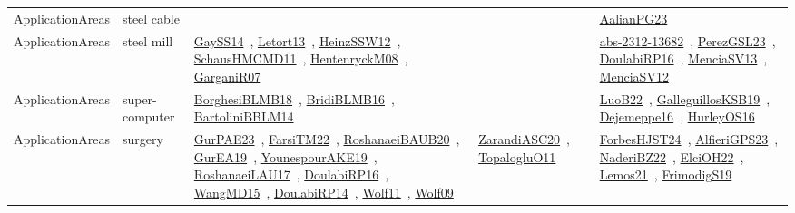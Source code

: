 {\begin{longtable}{lp{3cm}>{\raggedright\arraybackslash}p{6cm}>{\raggedright\arraybackslash}p{6cm}>{\raggedright\arraybackslash}p{8cm}}
ApplicationAreas & steel cable &  &  & \href{../works/AalianPG23.pdf}{AalianPG23}~\cite{AalianPG23}\\
ApplicationAreas & steel mill & \href{../works/GaySS14.pdf}{GaySS14}~\cite{GaySS14}, \href{../works/Letort13.pdf}{Letort13}~\cite{Letort13}, \href{../works/HeinzSSW12.pdf}{HeinzSSW12}~\cite{HeinzSSW12}, \href{../works/SchausHMCMD11.pdf}{SchausHMCMD11}~\cite{SchausHMCMD11}, \href{../works/HentenryckM08.pdf}{HentenryckM08}~\cite{HentenryckM08}, \href{../works/GarganiR07.pdf}{GarganiR07}~\cite{GarganiR07} &  & \href{../works/abs-2312-13682.pdf}{abs-2312-13682}~\cite{abs-2312-13682}, \href{../works/PerezGSL23.pdf}{PerezGSL23}~\cite{PerezGSL23}, \href{../works/DoulabiRP16.pdf}{DoulabiRP16}~\cite{DoulabiRP16}, \href{../works/MenciaSV13.pdf}{MenciaSV13}~\cite{MenciaSV13}, \href{../works/MenciaSV12.pdf}{MenciaSV12}~\cite{MenciaSV12}\\
ApplicationAreas & super-computer & \href{../works/BorghesiBLMB18.pdf}{BorghesiBLMB18}~\cite{BorghesiBLMB18}, \href{../works/BridiBLMB16.pdf}{BridiBLMB16}~\cite{BridiBLMB16}, \href{../works/BartoliniBBLM14.pdf}{BartoliniBBLM14}~\cite{BartoliniBBLM14} &  & \href{../works/LuoB22.pdf}{LuoB22}~\cite{LuoB22}, \href{../works/GalleguillosKSB19.pdf}{GalleguillosKSB19}~\cite{GalleguillosKSB19}, \href{../works/Dejemeppe16.pdf}{Dejemeppe16}~\cite{Dejemeppe16}, \href{../works/HurleyOS16.pdf}{HurleyOS16}~\cite{HurleyOS16}\\
ApplicationAreas & surgery & \href{../works/GurPAE23.pdf}{GurPAE23}~\cite{GurPAE23}, \href{../works/FarsiTM22.pdf}{FarsiTM22}~\cite{FarsiTM22}, \href{../works/RoshanaeiBAUB20.pdf}{RoshanaeiBAUB20}~\cite{RoshanaeiBAUB20}, \href{../works/GurEA19.pdf}{GurEA19}~\cite{GurEA19}, \href{../works/YounespourAKE19.pdf}{YounespourAKE19}~\cite{YounespourAKE19}, \href{../works/RoshanaeiLAU17.pdf}{RoshanaeiLAU17}~\cite{RoshanaeiLAU17}, \href{../works/DoulabiRP16.pdf}{DoulabiRP16}~\cite{DoulabiRP16}, \href{../works/WangMD15.pdf}{WangMD15}~\cite{WangMD15}, \href{../works/DoulabiRP14.pdf}{DoulabiRP14}~\cite{DoulabiRP14}, \href{../works/Wolf11.pdf}{Wolf11}~\cite{Wolf11}, \href{../works/Wolf09.pdf}{Wolf09}~\cite{Wolf09} & \href{../works/ZarandiASC20.pdf}{ZarandiASC20}~\cite{ZarandiASC20}, \href{../works/TopalogluO11.pdf}{TopalogluO11}~\cite{TopalogluO11} & \href{../works/ForbesHJST24.pdf}{ForbesHJST24}~\cite{ForbesHJST24}, \href{../works/AlfieriGPS23.pdf}{AlfieriGPS23}~\cite{AlfieriGPS23}, \href{../works/NaderiBZ22.pdf}{NaderiBZ22}~\cite{NaderiBZ22}, \href{../works/ElciOH22.pdf}{ElciOH22}~\cite{ElciOH22}, \href{../works/Lemos21.pdf}{Lemos21}~\cite{Lemos21}, \href{../works/FrimodigS19.pdf}{FrimodigS19}~\cite{FrimodigS19}\\

\end{longtable}}
